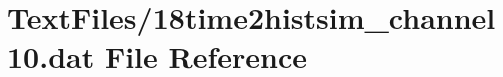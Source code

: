 \hypertarget{18time2histsim__channel10_8dat}{}\section{Text\+Files/18time2histsim\+\_\+channel10.dat File Reference}
\label{18time2histsim__channel10_8dat}
